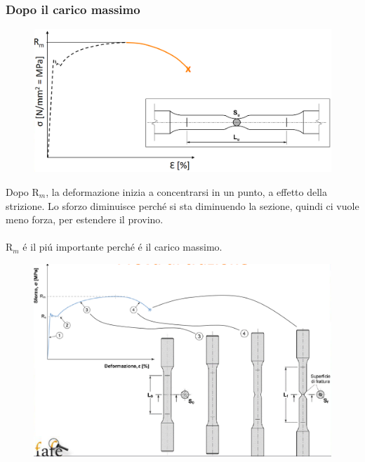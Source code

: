 \documentclass{article}
\begin{document}
{            \subsubsection{Dopo il carico massimo}
                \begin{figure}[!h]
                    \centering
                    \includegraphics[width=.85\linewidth]{Campo di Strizione.png}
                \end{figure}
                Dopo R$_m$, la deformazione inizia a concentrarsi in un punto, a effetto della strizione. Lo sforzo diminuisce perch\'e si sta diminuendo la sezione, quindi ci vuole meno forza, per estendere il provino.\\ \\
                R$_m$ \'e il pi\'u importante perch\'e \'e il carico massimo.
                \begin{figure}[!h]
                    \centering
                    \includegraphics[width=.85\linewidth]{Prova di Trazione - Cambio in Sezione.png}
                \end{figure}
}
\end{document}
